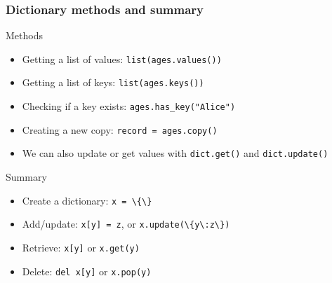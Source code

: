 \documentclass[presentation]{beamer}
\begin{document}
		
	\begin{frame}[fragile]
		\frametitle{Dictionary methods and summary}
		Methods
		\begin{itemize}
			\item Getting a list of values: \colorbox{codebg}{\lstinline|list(ages.values())|}
			\item Getting a list of keys: \colorbox{codebg}{\lstinline|list(ages.keys())|}
			\item Checking if a key exists: \colorbox{codebg}{\lstinline|ages.has_key("Alice")|}
			\item Creating a new copy: \colorbox{codebg}{\lstinline|record = ages.copy()|}
			\item We can also update or get values with \colorbox{codebg}{\lstinline|dict.get()| and \lstinline|dict.update()|}
		\end{itemize}
		Summary
		\begin{itemize}
			\item Create a dictionary: \colorbox{codebg}{\lstinline|x = \{\}|}
			\item Add/update: \colorbox{codebg}{\lstinline|x[y] = z|}, or \colorbox{codebg}{\lstinline|x.update(\{y\:z\})|}
			\item Retrieve: \colorbox{codebg}{\lstinline|x[y]|} or \colorbox{codebg}{\lstinline|x.get(y)|}
			\item Delete: \colorbox{codebg}{\lstinline|del x[y]|} or \colorbox{codebg}{\lstinline|x.pop(y)|}
		\end{itemize}
	\end{frame}
	
\end{document}
